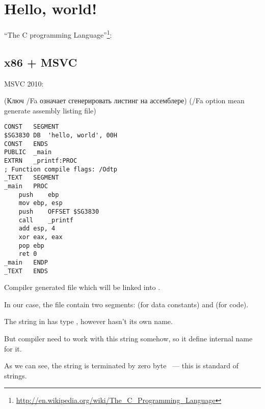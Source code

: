 ﻿\section{Hello, world!}
\label{sec:helloworld}

 ``The C programming Language''\footnote{\url{http://en.wikipedia.org/wiki/The_C_Programming_Language}}:



\subsection{x86 + MSVC}

 MSVC 2010: 

\IFRU
{(Ключ /Fa означает сгенерировать листинг на ассемблере)}
{(/Fa option mean generate assembly listing file)}

\begin{lstlisting}
CONST	SEGMENT
$SG3830	DB	'hello, world', 00H
CONST	ENDS
PUBLIC	_main
EXTRN	_printf:PROC
; Function compile flags: /Odtp
_TEXT	SEGMENT
_main	PROC
	push	ebp
	mov	ebp, esp
	push	OFFSET $SG3830
	call	_printf
	add	esp, 4
	xor	eax, eax
	pop	ebp
	ret	0
_main	ENDP
_TEXT	ENDS
\end{lstlisting}

{Compiler generated  file which will be linked into .}

{In our case, the file contain two segments:  (for data constants) and  (for code).} 

{The string  in \CCpp has type , however hasn't its own name.}

{But compiler need to work with this string somehow, so it define internal name  for it.}

{As we can see, the string is terminated by zero byte ~--- this is \CCpp standard of strings.}

